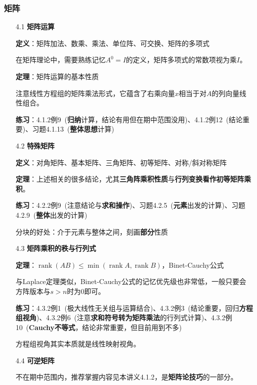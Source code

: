 \documentclass[a4paper,UTF8,fontset=windows]{ctexart}
\DeclareMathOperator{\rank}{rank}
\newcommand*{\note}{\noindent *}
\begin{document}
\subsubsection{矩阵}
\begin{enumerate}
    \item[4.1] \textbf{矩阵运算}
    
    \textbf{定义}：矩阵加法、数乘、乘法、单位阵、可交换、矩阵的多项式

    \note 在矩阵理论中，需要熟练记忆$A^0=I$的定义，矩阵多项式的常数项视为乘$I$。

    \textbf{定理}：矩阵运算的基本性质

    \note 注意线性方程组的矩阵乘法形式，它蕴含了右乘向量$x$相当于对$A$的列向量线性组合。

    \textbf{练习}：4.1.2例9\ (\textbf{归纳}计算，结论有用但在期中范围没用)、4.1.2例12\ (结论重要)、习题4.1.13\ (\textbf{整体思想}计算)

    \item[4.2] \textbf{特殊矩阵}
    
    \textbf{定义}：对角矩阵、基本矩阵、三角矩阵、初等矩阵、对称/斜对称矩阵

    \textbf{定理}：上述相关的很多结论，尤其\textbf{三角阵乘积性质}与\textbf{行列变换看作初等矩阵乘积}。

    \textbf{练习}：4.2.2例9\ (注意结论与\textbf{求和操作})、习题4.2.5\ (\textbf{元素}出发的计算)、习题4.2.9\ (\textbf{整体}出发的计算)

    \note 分块的好处：介于元素与整体之间，刻画\textbf{部分}性质

    \item[4.3] \textbf{矩阵乘积的秩与行列式}
    
    \textbf{定理}：$\rank(AB)\le\min(\rank A,\rank B)$，Binet-Cauchy公式

    \note 与Laplace定理类似，Binet-Cauchy公式的记忆优先级也非常低，一般只要会方阵版本与$s>n$时为0即可。

    \textbf{练习}：4.3.2例1\ (极大线性无关组与运算结合)、4.3.2例3\ (结论重要，回归\textbf{方程组视角})、4.3.2例6\ (注意\textbf{求和符号转为矩阵乘法}的行列式计算)、4.3.2例10\ (\textbf{Cauchy不等式}，结论非常重要，但目前用到不多)

    \note 方程组视角其实本质就是线性映射视角。

    \item[4.4] \textbf{可逆矩阵}
    
    不在期中范围内，推荐掌握内容见本讲义4.1.2，是\textbf{矩阵论技巧}的一部分。


\end{enumerate}
\end{document}
